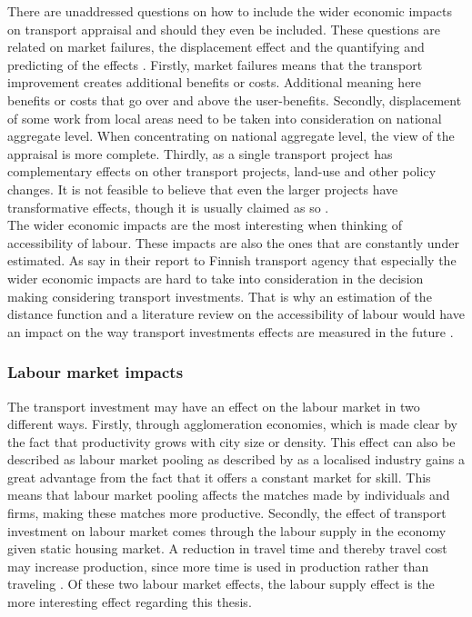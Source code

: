 There are unaddressed questions on how to include the wider economic impacts on transport appraisal and should they even be included. These questions are related on market failures, the displacement effect and the quantifying and predicting of the effects \citep{venables2017}. Firstly, market failures means that the transport improvement creates additional benefits or costs. Additional meaning here benefits or costs that go over and above the user-benefits. Secondly, displacement of some work from local areas need to be taken into consideration on national aggregate level. When concentrating on national aggregate level, the view of the appraisal is more complete. Thirdly, as a single transport project has complementary effects on other transport projects, land-use and other policy changes. It is not feasible to believe that even the larger projects have transformative effects, though it is usually claimed as so \citep{venables2017}. \\

The wider economic impacts are the most interesting when thinking of accessibility of labour. These impacts are also the ones that are constantly under estimated. As \cite{laakso} say in their report to Finnish transport agency that especially the wider economic impacts are hard to take into consideration in the decision making considering transport investments. That is why an estimation of the distance function and a literature review on the accessibility of labour would have an impact on the way transport investments effects are measured in the future \citep{laakso}.\\


\subsubsection{Labour market impacts}

The transport investment may have an effect on the labour market in two different ways. Firstly, through agglomeration economies, which is made clear by the fact that productivity grows with city size or density. \citep{andersson} This effect can also be described as labour market pooling as described by \cite{marshall} as a localised industry gains a great advantage from the fact that it offers a constant market for skill. This means that labour market pooling affects the matches made by individuals and firms, making these matches more productive. Secondly, the effect of transport investment on labour market comes through the labour supply in the economy given static housing market. A reduction in travel time and thereby travel cost may increase production, since more time is used in production rather than traveling \citep{andersson}. Of these two labour market effects, the labour supply effect is the more interesting effect regarding this thesis. \\

